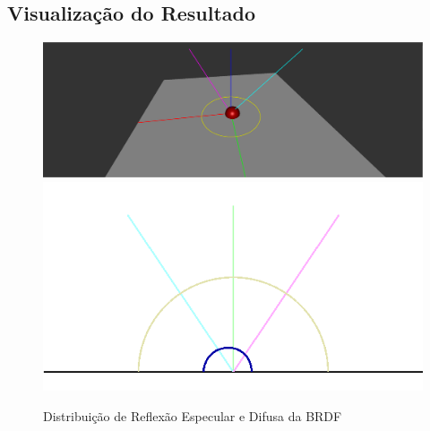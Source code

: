 \subsection{Visualização do Resultado}
\begin{figure}[H]
    \caption{\small{Distribuição de Reflexão Especular e Difusa da BRDF}}\label{fig-oren-nayar-plots}
    \vspace{42px}
  \includegraphics[width=\linewidth]{./Imagens/brdfs/oren-nayar-3D-plot}
\endminipage\hfill
{}
  \includegraphics[width=\linewidth]{./Imagens/brdfs/oren-nayar-polar-plot.png}
\endminipage\hfill
\end{figure}

